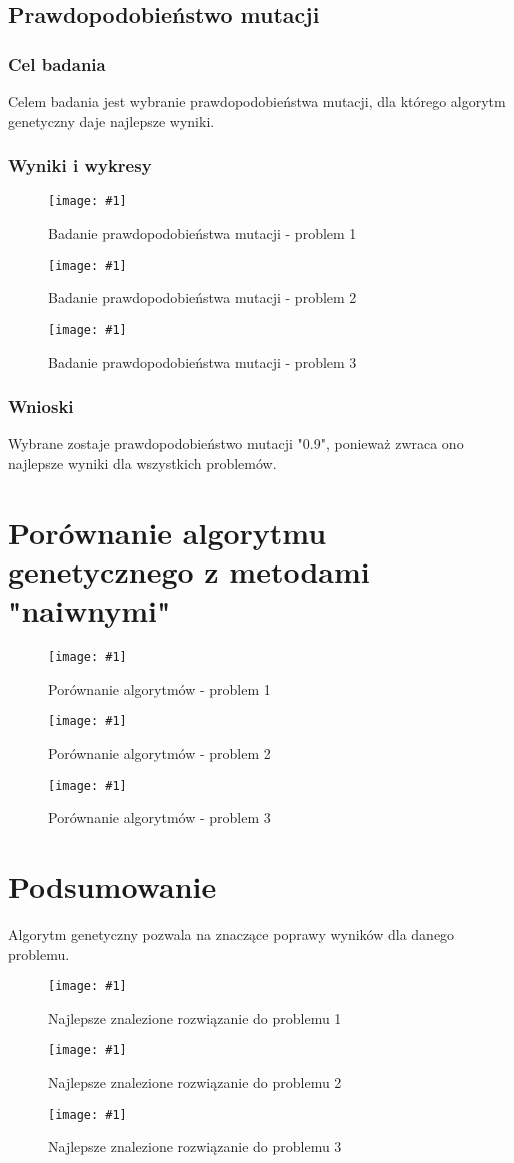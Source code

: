 \documentclass[12pt,a4paper]{article}
\newcommand{\image}[2] {
    \begin{figure}[H]
        \begin{center}
            \texttt{[image: \#1]}
        \end{center}
        \caption{#2}
        \label{#1}
    \end{figure}
}
\begin{document}
\subsection{Prawdopodobieństwo mutacji}
\subsubsection{Cel badania}
Celem badania jest wybranie prawdopodobieństwa mutacji, dla którego algorytm genetyczny daje najlepsze wyniki.
\subsubsection{Wyniki i wykresy}
\image{images/Badanie p. mutacji_1}{Badanie prawdopodobieństwa mutacji - problem 1}
\image{images/Badanie p. mutacji_2}{Badanie prawdopodobieństwa mutacji - problem 2}
\image{images/Badanie p. mutacji_3}{Badanie prawdopodobieństwa mutacji - problem 3}
\subsubsection{Wnioski}
Wybrane zostaje prawdopodobieństwo mutacji "0.9", ponieważ zwraca ono najlepsze wyniki dla wszystkich problemów.

\section{Porównanie algorytmu genetycznego z metodami "naiwnymi"}
\image{images/Porównanie algorytmów_1}{Porównanie algorytmów - problem 1}
\image{images/Porównanie algorytmów_2}{Porównanie algorytmów - problem 2}
\image{images/Porównanie algorytmów_3}{Porównanie algorytmów - problem 3}

\section{Podsumowanie}
Algorytm genetyczny pozwala na znaczące poprawy wyników dla danego problemu.
\image{images/solution1}{Najlepsze znalezione rozwiązanie do problemu 1}
\image{images/solution2}{Najlepsze znalezione rozwiązanie do problemu 2}
\image{images/solution3}{Najlepsze znalezione rozwiązanie do problemu 3}
\end{document}
